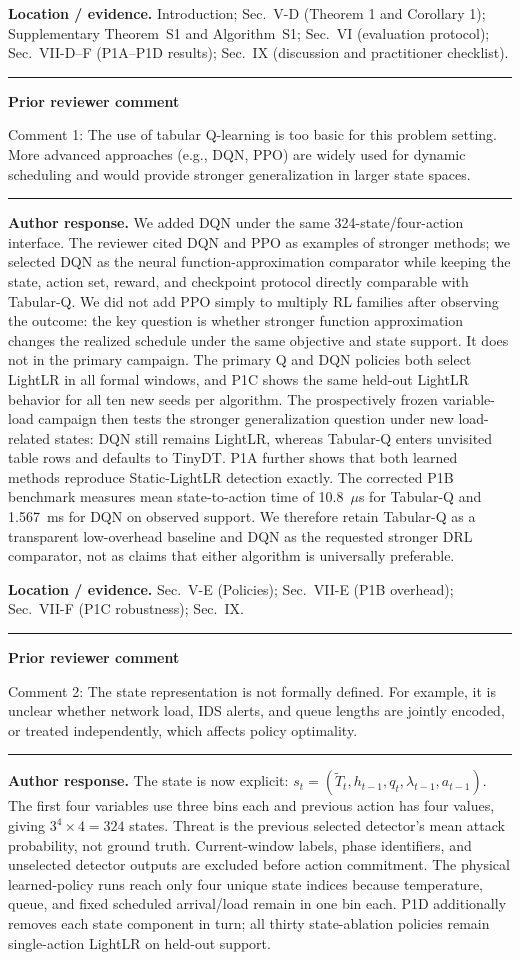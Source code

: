 \documentclass[11pt]{article}
\newenvironment{qbox}
    {\par\vspace{4pt}\noindent\begin{minipage}{\linewidth}\rule{\linewidth}{0.4pt}\par\noindent\textbf{Prior reviewer comment}\par\noindent}
    {\par\rule{\linewidth}{0.4pt}\end{minipage}\par\vspace{4pt}}
\begin{document}
\textbf{Location / evidence.} Introduction; Sec.~V-D (Theorem 1 and Corollary 1); Supplementary Theorem~S1 and Algorithm~S1; Sec.~VI (evaluation protocol); Sec.~VII-D--F (P1A--P1D results); Sec.~IX (discussion and practitioner checklist).

\begin{qbox}
Comment 1: The use of tabular Q-learning is too basic for this problem setting. More advanced approaches (e.g., DQN, PPO) are widely used for dynamic scheduling and would provide stronger generalization in larger state spaces.
\end{qbox}

\textbf{Author response.} We added DQN under the same 324-state/four-action interface. The reviewer cited DQN and PPO as examples of stronger methods; we selected DQN as the neural function-approximation comparator while keeping the state, action set, reward, and checkpoint protocol directly comparable with Tabular-Q. We did not add PPO simply to multiply RL families after observing the outcome: the key question is whether stronger function approximation changes the realized schedule under the same objective and state support. It does not in the primary campaign. The primary Q and DQN policies both select LightLR in all formal windows, and P1C shows the same held-out LightLR behavior for all ten new seeds per algorithm. The prospectively frozen variable-load campaign then tests the stronger generalization question under new load-related states: DQN still remains LightLR, whereas Tabular-Q enters unvisited table rows and defaults to TinyDT. P1A further shows that both learned methods reproduce Static-LightLR detection exactly. The corrected P1B benchmark measures mean state-to-action time of 10.8~$\mu$s for Tabular-Q and 1.567~ms for DQN on observed support. We therefore retain Tabular-Q as a transparent low-overhead baseline and DQN as the requested stronger DRL comparator, not as claims that either algorithm is universally preferable.

\textbf{Location / evidence.} Sec.~V-E (Policies); Sec.~VII-E (P1B overhead); Sec.~VII-F (P1C robustness); Sec.~IX.

\begin{qbox}
Comment 2: The state representation is not formally defined. For example, it is unclear whether network load, IDS alerts, and queue lengths are jointly encoded, or treated independently, which affects policy optimality.
\end{qbox}

\textbf{Author response.} The state is now explicit: $s_t=(\widetilde T_t, h_{t-1}, q_t, \lambda_{t-1}, a_{t-1})$. The first four variables use three bins each and previous action has four values, giving $3^4\times 4=324$ states. Threat is the previous selected detector's mean attack probability, not ground truth. Current-window labels, phase identifiers, and unselected detector outputs are excluded before action commitment. The physical learned-policy runs reach only four unique state indices because temperature, queue, and fixed scheduled arrival/load remain in one bin each. P1D additionally removes each state component in turn; all thirty state-ablation policies remain single-action LightLR on held-out support.
\end{document}
